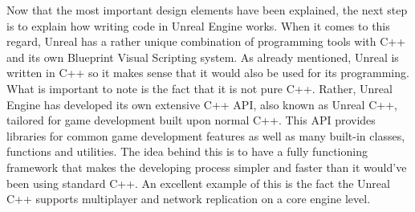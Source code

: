 Now that the most important design elements have been explained, the next step is to explain how writing code in Unreal Engine works. When it comes to this regard, Unreal has a rather unique combination of programming tools with C++ and its own Blueprint Visual Scripting system. As already mentioned, Unreal is written in C++ so it makes sense that it would also be used for its programming. What is important to note is the fact that it is not pure C++. Rather, Unreal Engine has developed its own extensive C++ \acs{API}, also known as Unreal C++, tailored for game development built upon normal C++\cite{bib:UECPlus}. This \acs{API} provides libraries for common game development features as well as many built-in classes, functions and utilities. The idea behind this is to have a fully functioning framework that makes the developing process simpler and faster than it would've been using standard C++. An excellent example of this is the fact the Unreal C++ supports multiplayer and network replication on a core engine level.\\

